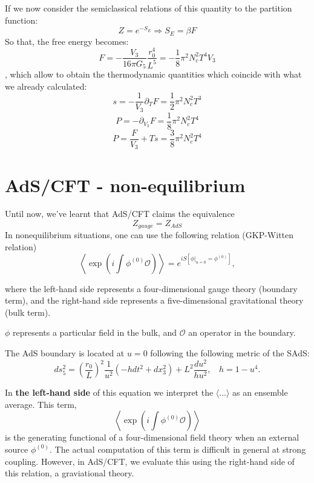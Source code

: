 \documentclass[12pt]{article}
\begin{document}
If we now consider the semiclassical relations of this quantity to the partition function:
\[
    Z = e^{-S_E} \Longrightarrow S_E=\beta F
\]
So that, the free energy becomes:
\[
    F = -\frac{V_3}{16\pi G_5}\frac{r_0^4}{L^5} = -\frac{1}{8}\pi^2N_c^2 T^4V_3
\]
, which allow to obtain the thermodynamic quantities which coincide with what we already calculated:
\[
    s= -\frac{1}{V_3}\partial_T F = \frac{1}{2}\pi^2 N_c^2 T^3
\]
\[
    P = -\partial_{V_3} F = \frac{1}{8}\pi^2 N_c^2 T^4
\]
\[
    P = \frac{F}{V_3} +Ts = \frac{3}{8}\pi^2 N_c^2 T^4
\]

\section{AdS/CFT - non-equilibrium}

Until now, we've learnt that AdS/CFT claims the equivalence
\[
    Z_{gauge} = Z_{AdS}
\]
In nonequilibrium situations, one can use the following relation (GKP-Witten relation)
\[
    \left\langle\exp\left(i\int \phi^{(0)} \mathcal{O}\right)\right\rangle = e^{iS[\left.\phi\right|_{u=0}=\phi^{(0)}]},
\]

where the left-hand side represents a four-dimensional gauge theory (boundary term), and the right-hand side represents a five-dimensional gravitational theory (bulk term).

\vspace{.25cm}

$\phi$ represents a particular field in the bulk, and $\mathcal{O}$ an operator in the boundary.

\vspace{.25cm}

The AdS boundary is located at $u=0$ following the following metric of the SAdS:
\[
    ds_5^2=\left(\frac{r_0}{L}\right)^2 \frac{1}{u^2}(-hdt^2+dx_3^2) + L^2 \frac{du^2}{hu^2}, ~~~~ h = 1-u^4.
\]

\vspace{.25cm}

In \textbf{the left-hand side} of this equation we interpret the $\langle...\rangle$ as an ensemble average. This term,
\[
    \left\langle\exp\left(i\int \phi^{(0)} \mathcal{O}\right)\right\rangle
\]
is the generating functional of a four-dimensional field theory when an external source $\phi^{(0)}$. The actual computation of this term is difficult in general at strong coupling. However, in AdS/CFT, we evaluate this using the right-hand side of this relation, a graviational theory.
\end{document}
